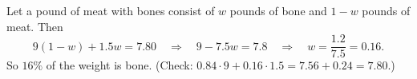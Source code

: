 Let a pound of meat with bones consist of $w$ pounds of bone and $1-w$ pounds of meat. Then
\[
9(1-w)+1.5w=7.80\quad\Longrightarrow\quad9-7.5w=7.8\quad\Longrightarrow\quad w=\dfrac{1.2}{7.5}=0.16 .
\]
So $\boxed{16\%}$ of the weight is bone. (Check: $0.84\cdot9+0.16\cdot1.5=7.56+0.24=7.80$.)
